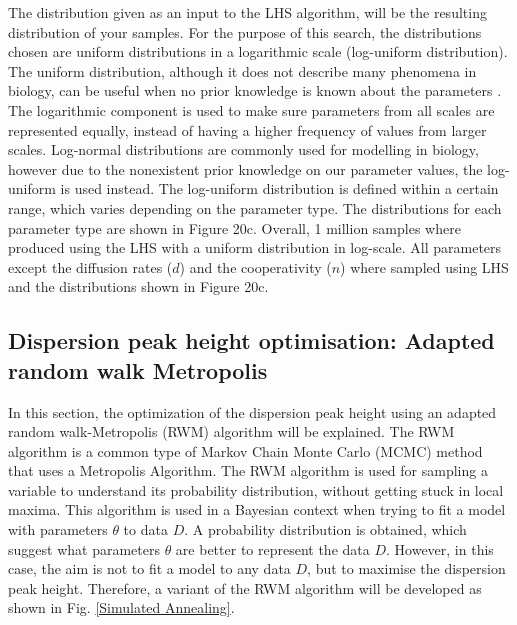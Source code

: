 The distribution given as an input to the LHS algorithm, will be the resulting distribution of your samples. For the purpose of this search, the distributions chosen are uniform distributions in a logarithmic scale (log-uniform distribution). The uniform distribution, although it does not describe many phenomena in biology, can be useful when no prior knowledge is known about the parameters \parencite{Frank2009}. The logarithmic component is used to make sure parameters from all scales are represented equally, instead of having a higher frequency of values from larger scales. Log-normal distributions are commonly used for modelling in biology, however due to the nonexistent prior knowledge on our parameter values, the log-uniform is used instead. The log-uniform distribution is defined within a certain range, which varies depending on the parameter type. The distributions for each parameter type are shown in Figure 20c. Overall, 1 million samples where produced using the LHS with a uniform distribution in log-scale. All parameters except the diffusion rates ($d$) and the cooperativity ($n$) where sampled using LHS and the distributions shown in Figure 20c.


\subsection{Dispersion peak height optimisation: Adapted random walk Metropolis}
In this section, the optimization of the dispersion peak height using an adapted random walk-Metropolis (RWM) algorithm will be explained.
The RWM algorithm is a common type of Markov Chain Monte Carlo (MCMC) method that uses a Metropolis Algorithm.
The RWM algorithm is used for sampling a variable to understand its probability distribution, without getting stuck in local maxima.
This algorithm is used in a Bayesian context when trying to fit a model with parameters $\theta$ to data $D$.
A probability distribution is obtained, which suggest what parameters $\theta$ are better to represent the data $D$.
However, in this case, the aim is not to fit a model to any data $D$, but to maximise the dispersion peak height.
Therefore, a variant of the RWM algorithm will be developed as shown in Fig. \ref{Simulated Annealing}.

